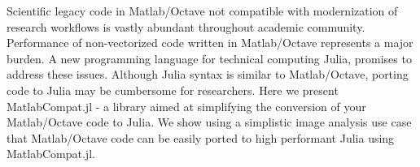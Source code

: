 Scientific legacy code in Matlab/Octave not compatible with modernization of research workflows is vastly abundant throughout academic community. Performance of non-vectorized code written in Matlab/Octave represents a major burden. A new programming language for technical computing Julia, promises to address these issues. Although Julia syntax is similar to Matlab/Octave, porting code to Julia may be cumbersome for researchers. Here we present MatlabCompat.jl - a library aimed at simplifying the conversion of your Matlab/Octave code to Julia. We show using a simplistic image analysis use case that Matlab/Octave code can be easily ported to high performant Julia using MatlabCompat.jl.
  
  